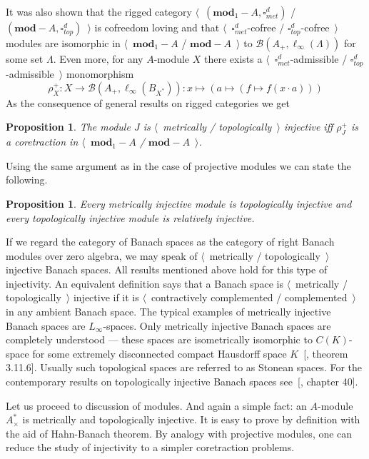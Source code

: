 \documentclass[12pt]{article}
\newtheorem{proposition}[theorem]{Proposition}
\begin{document}
It was also shown that the rigged category
$\langle$~$(\mathbf{mod}_1-A,\square_{met}^d)$ / 
$(\mathbf{mod}-A,\square_{top}^d)$~$\rangle$ is
cofreedom loving and that $\langle$~$\square_{met}^d$-cofree /
$\square_{top}^d$-cofree~$\rangle$ modules are isomorphic in
$\langle$~$\mathbf{mod}_1-A$ / $\mathbf{mod}-A$~$\rangle$ to
$\mathcal{B}(A_+,\ell_\infty(\Lambda))$ for some set $\Lambda$.
Even more, for any $A$-module $X$ there exists a
$\langle$~$\square_{met}^d$-admissible / $\square_{top}^d$-admissible~$\rangle$
monomorphism
$$
    \rho_X^+:X\to\mathcal{B}(A_+,\ell_\infty(B_{X^*})):
    x\mapsto(a\mapsto(f\mapsto f(x\cdot a)))
$$
As the consequence of general results on rigged categories we get

\begin{proposition}\label{MetTopInjModViaCanonicMorph} The module $J$ is
    $\langle$~metrically / topologically~$\rangle$ injective iff $\rho_J^+$ is a
    coretraction in $\langle$~$\mathbf{mod}_1-A$ / $\mathbf{mod}-A$~$\rangle$.
\end{proposition}

Using the same argument as in the case of projective modules we can state the
following.

\begin{proposition}\label{MetInjIsTopInjAndTopInjIsRelInj} Every metrically
    injective module is topologically injective and every topologically
    injective module is relatively injective.
\end{proposition}

If we regard the category of Banach spaces as the category of right Banach
modules over zero algebra, we may speak of $\langle$~metrically /
topologically~$\rangle$ injective Banach spaces. All results mentioned above
hold for this type of injectivity. An equivalent definition says that a Banach
space is $\langle$~metrically / topologically~$\rangle$ injective if it is
$\langle$~contractively complemented / complemented~$\rangle$ in any ambient
Banach space. The typical examples of metrically injective Banach spaces are
$L_\infty$-spaces. Only metrically injective Banach spaces are completely
understood --- these spaces are isometrically isomorphic to $C(K)$-space for
some extremely disconnected compact Hausdorff space
$K$~[\cite{LaceyIsomThOfClassicBanSp}, theorem 3.11.6]. Usually such topological
spaces are referred to as Stonean spaces. For the contemporary results on
topologically injective Banach spaces see~[\cite{JohnLinHandbookGeomBanSp},
chapter 40].

Let us proceed to discussion of modules. And again a simple fact: an $A$-module
$A_\times^*$ is metrically and topologically injective. It is easy to prove by
definition with the aid of Hahn-Banach theorem. By analogy with projective
modules, one can reduce the study of injectivity to a simpler coretraction
problems.
\end{document}
